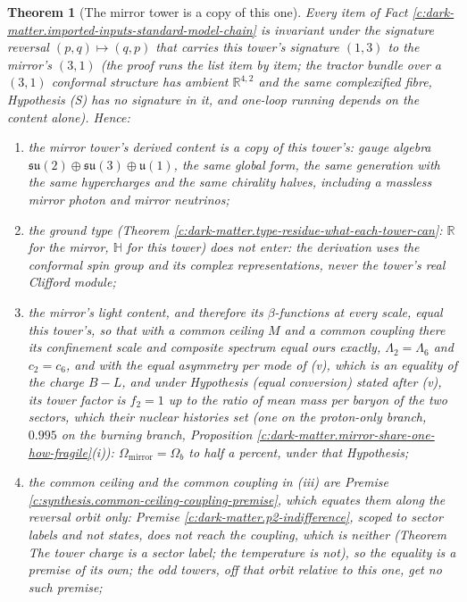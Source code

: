 \documentclass[11pt]{article}
\newtheorem{theorem}{Theorem}[section]
\theoremstyle{definition}
\theoremstyle{plain}
\newcommand{\changedmark}[2]{\marginpar{\raggedright\scriptsize\color{#1}#2}}
\providecommand{\R}{}\renewcommand{\R}{\mathbb{R}}
\begin{document}
\begin{theorem}[The mirror tower is a copy of this one]\label{c:dark-matter.mirror-tower-copy-one}
\changedmark{BurntOrange}{changed since the deposit}
Every item of Fact \ref{c:dark-matter.imported-inputs-standard-model-chain} is invariant under the signature reversal $(p,q) \mapsto (q,p)$ that carries this tower's signature $(1,3)$ to the mirror's $(3,1)$ (the proof runs the list item by item; the tractor bundle over a $(3,1)$ conformal structure has ambient $\R^{4,2}$ and the same complexified fibre, Hypothesis (S) has no signature in it, and one-loop running depends on the content alone). Hence:
\begin{enumerate}
\item[(i)] the mirror tower's derived content is a copy of this tower's: gauge algebra $\mathfrak{su}(2) \oplus \mathfrak{su}(3) \oplus \mathfrak{u}(1)$, the same global form, the same generation with the same hypercharges and the same chirality halves, including a massless mirror photon and mirror neutrinos;
\item[(ii)] the ground type (Theorem \ref{c:dark-matter.type-residue-what-each-tower-can}: $\R$ for the mirror, $\mathbb{H}$ for this tower) does not enter: the derivation uses the conformal spin group and its complex representations, never the tower's real Clifford module;
\item[(iii)] the mirror's light content, and therefore its $\beta$-functions at every scale, equal this tower's, so that with a common ceiling $M$ and a common coupling there its confinement scale and composite spectrum equal ours exactly, $\Lambda_{2} = \Lambda_{6}$ and $c_{2} = c_{6}$, and with the equal asymmetry per mode of (v), which is an equality of the charge $B - L$, and under Hypothesis (equal conversion) stated after (v), its tower factor is $f_{2} = 1$ up to the ratio of mean mass per baryon of the two sectors, which their nuclear histories set (one on the proton-only branch, $0.995$ on the burning branch, Proposition \ref{c:dark-matter.mirror-share-one-how-fragile}(i)): $\Omega_{\mathrm{mirror}} = \Omega_{b}$ to half a percent, under that Hypothesis;
\item[(iv)] the common ceiling and the common coupling in (iii) are Premise \ref{c:synthesis.common-ceiling-coupling-premise}, which equates them along the reversal orbit only: Premise \ref{c:dark-matter.p2-indifference}, scoped to sector labels and not states, does not reach the coupling, which is neither (Theorem \emph{The tower charge is a sector label; the temperature is not}), so the equality is a premise of its own; the odd towers, off that orbit relative to this one, get no such premise;

\end{enumerate}
\end{theorem}
\end{document}
